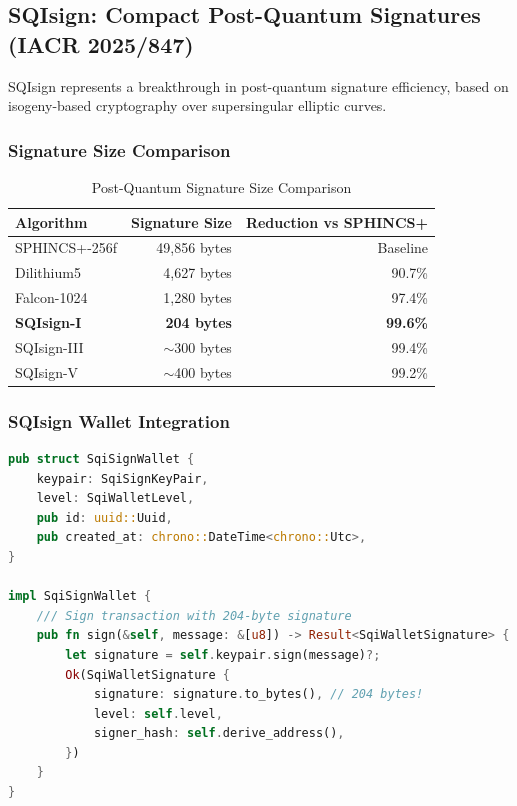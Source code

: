 \documentclass[11pt,a4paper]{article}
\begin{document}
\subsection{SQIsign: Compact Post-Quantum Signatures (IACR 2025/847)}

SQIsign represents a breakthrough in post-quantum signature efficiency, based on isogeny-based cryptography over supersingular elliptic curves.

\subsubsection{Signature Size Comparison}

\begin{table}[h]
\centering
\begin{tabular}{lrr}
\toprule
\textbf{Algorithm} & \textbf{Signature Size} & \textbf{Reduction vs SPHINCS+} \\
\midrule
SPHINCS+-256f & 49,856 bytes & Baseline \\
Dilithium5 & 4,627 bytes & 90.7\% \\
Falcon-1024 & 1,280 bytes & 97.4\% \\
\textbf{SQIsign-I} & \textbf{204 bytes} & \textbf{99.6\%} \\
SQIsign-III & $\sim$300 bytes & 99.4\% \\
SQIsign-V & $\sim$400 bytes & 99.2\% \\
\bottomrule
\end{tabular}
\caption{Post-Quantum Signature Size Comparison}
\end{table}

\subsubsection{SQIsign Wallet Integration}

\begin{lstlisting}[language=Rust, caption=SQIsign Wallet Implementation]
pub struct SqiSignWallet {
    keypair: SqiSignKeyPair,
    level: SqiWalletLevel,
    pub id: uuid::Uuid,
    pub created_at: chrono::DateTime<chrono::Utc>,
}

impl SqiSignWallet {
    /// Sign transaction with 204-byte signature
    pub fn sign(&self, message: &[u8]) -> Result<SqiWalletSignature> {
        let signature = self.keypair.sign(message)?;
        Ok(SqiWalletSignature {
            signature: signature.to_bytes(), // 204 bytes!
            level: self.level,
            signer_hash: self.derive_address(),
        })
    }
}
\end{lstlisting}
\end{document}

